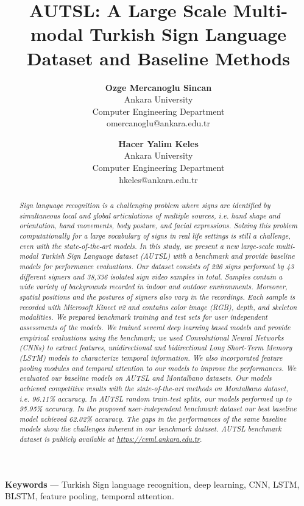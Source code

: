 \documentclass[11pt, a4paper, singlecolumn]{article}
\title{\textbf{AUTSL: A Large Scale Multi-modal Turkish Sign Language Dataset and Baseline Methods}}
\date{\vspace*{2pt}}
\author{
	\normalsize \textbf{Ozge Mercanoglu Sincan}\\
	\normalsize Ankara University\\
	\normalsize Computer Engineering Department\\
	\normalsize omercanoglu@ankara.edu.tr
	\and
	\normalsize \textbf{Hacer Yalim Keles}\\
	\normalsize Ankara University\\
	\normalsize Computer Engineering Department\\
	\normalsize hkeles@ankara.edu.tr
}
\begin{document}
\maketitle


\begin{abstract}{
	\vspace*{-1.5em}
	\it 
	Sign language recognition is a challenging problem where signs are identified by simultaneous local and global articulations of multiple sources, i.e. hand shape and orientation, hand movements, body posture, and facial expressions. Solving this problem computationally for a large vocabulary of signs in real life settings is still a challenge, even with the state-of-the-art models.  In this study, we present a new large-scale multi-modal Turkish Sign Language dataset (AUTSL) with a benchmark and provide baseline models for performance evaluations. Our dataset consists of 226 signs performed by 43 different signers and 38,336 isolated sign video samples in total. Samples contain a wide variety of backgrounds recorded in indoor and outdoor environments. Moreover, spatial positions and the postures of signers also vary in the recordings. Each sample is recorded with Microsoft Kinect v2 and contains color image (RGB), depth, and skeleton  modalities. We prepared benchmark training and test sets for user independent assessments of the models. We trained several deep learning based models and provide empirical evaluations using the benchmark; we used Convolutional Neural Networks (CNNs) to extract features, unidirectional and bidirectional Long Short-Term Memory (LSTM) models to characterize temporal information. We also incorporated feature pooling modules and temporal attention to our models to improve the performances. We evaluated our baseline models on AUTSL and Montalbano datasets. Our models achieved competitive results with the state-of-the-art methods on Montalbano dataset, i.e. 96.11\% accuracy. In AUTSL random train-test splits, our models performed up to 95.95\% accuracy. In the proposed user-independent benchmark dataset our best baseline model achieved 62.02\% accuracy. The gaps in the performances of the same baseline models show the challenges inherent in our benchmark dataset. AUTSL benchmark dataset is publicly available at \href{https://cvml.ankara.edu.tr}{https://cvml.ankara.edu.tr}.
	
}\end{abstract}

\textbf{Keywords} --- Turkish Sign language recognition, deep learning, CNN, LSTM, BLSTM, feature pooling, temporal attention.
\end{document}

